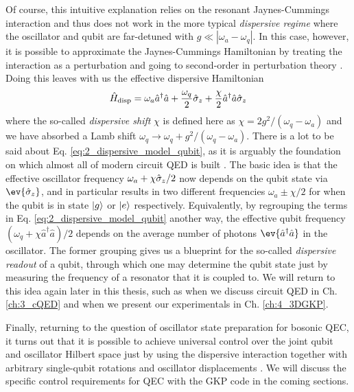 Of course, this intuitive explanation relies on the resonant Jaynes-Cummings interaction and thus does not work in the more typical \textit{dispersive regime} where the oscillator and qubit are far-detuned with $g \ll |\omega_a - \omega_q|$. In this case, however, it is possible to approximate the Jaynes-Cummings Hamiltonian by treating the interaction as a perturbation and going to second-order in perturbation theory \cite{raimond2006exploring}. Doing this leaves with us the effective dispersive Hamiltonian
\begin{equation}
    \hat{H}_{\rm disp} = \omega_a \hat{a}^\dagger\hat{a} + \frac{\omega_q}{2}\hat{\sigma}_z + \frac{\chi}{2}\hat{a}^\dagger\hat{a}\hat{\sigma}_z
    \label{eq:2_dispersive_model_qubit}
\end{equation}
where the so-called \textit{dispersive shift} $\chi$ is defined here as $\chi = 2g^2/(\omega_q - \omega_a)$ and we have absorbed a Lamb shift $\omega_q \to \omega_q + g^2/(\omega_q - \omega_a)$. There is a lot to be said about Eq. \eqref{eq:2_dispersive_model_qubit}, as it is arguably the foundation on which almost all of modern circuit QED is built \cite{blais2004cavity}. The basic idea is that the effective oscillator frequency $\omega_a + \chi\hat{\sigma}_z/2$ now depends on the qubit state via $\ev{\sigmaz}$, and in particular results in two different frequencies $\omega_a \pm \chi/2$ for when the qubit is in state $\lvert g\rangle$ or $\lvert e\rangle$ respectively. Equivalently, by regrouping the terms in Eq. \eqref{eq:2_dispersive_model_qubit} another way, the effective qubit frequency $(\omega_q + \chi \hat{a}^\dagger\hat{a})/2$ depends on the average number of photons $\ev{\hat{a}^\dagger\hat{a}}$ in the oscillator. The former grouping gives us a blueprint for the so-called \textit{dispersive readout} of a qubit, through which one may determine the qubit state just by measuring the frequency of a resonator that it is coupled to. We will return to this idea again later in this thesis, such as when we discuss circuit QED in Ch. \ref{ch:3_cQED} and when we present our experimentals in Ch. \ref{ch:4_3DGKP}. 

Finally, returning to the question of oscillator state preparation for bosonic QEC, it turns out that it is possible to achieve universal control over the joint qubit and oscillator Hilbert space just by using the dispersive interaction together with arbitrary single-qubit rotations and oscillator displacements \cite{vlastakis2015controlling, reinhold2019controlling, eickbusch2022fast}. We will discuss the specific control requirements for QEC with the GKP code in the coming sections. 


